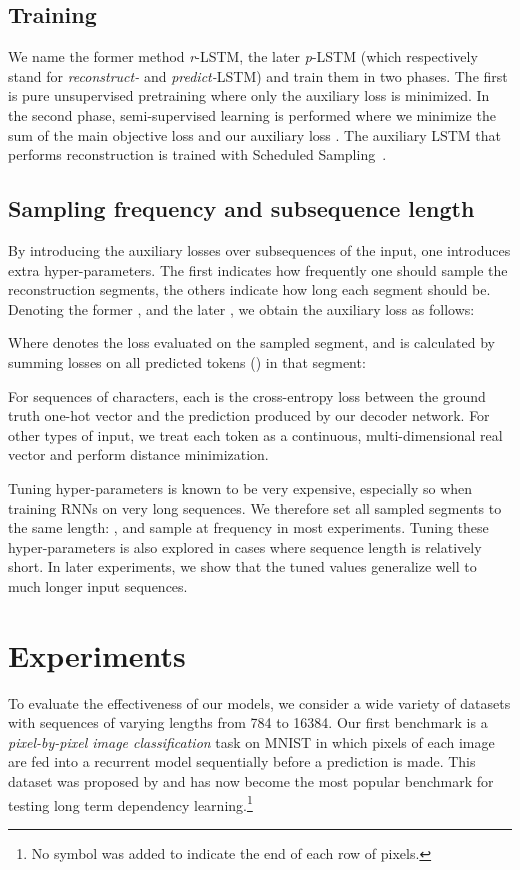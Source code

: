 \documentclass{article}
\newcommand{\rlstm}{{\it r}-LSTM}
\newcommand{\plstm}{{\it p}-LSTM}
\begin{document}
\subsection{Training}

We name the former method \rlstm{}, the later \plstm{} (which respectively stand for {\it reconstruct-} and {\it predict-}LSTM) and train them in two phases. The first is pure unsupervised pretraining where only the auxiliary loss is minimized. In the second phase, semi-supervised learning is performed where we minimize the sum of the main objective loss  and our auxiliary loss . The auxiliary LSTM that performs reconstruction is trained with Scheduled Sampling~\cite{bengio2015scheduled}.

\subsection{Sampling frequency and subsequence length}

By introducing the auxiliary losses over subsequences of the input, one introduces extra hyper-parameters. The first indicates how frequently one should sample the reconstruction segments, the others indicate how long each segment should be. Denoting the former , and the later , we obtain the auxiliary loss as follows:

Where  denotes the loss evaluated on the  sampled segment, and is calculated by summing losses on all predicted tokens () in that segment:
    
For sequences of characters, each  is the cross-entropy loss between the ground truth one-hot vector and the prediction produced by our decoder network. For other types of input, we treat each token as a continuous, multi-dimensional real vector and perform  distance minimization.

Tuning hyper-parameters is known to be very expensive, especially so when training RNNs on very long sequences. We therefore set all sampled segments to the same length: , and sample at frequency  in most experiments. Tuning these hyper-parameters is also explored in cases where sequence length is relatively short. In later experiments, we show that the tuned values generalize well to much longer input sequences.

\section{Experiments} 

To evaluate the effectiveness of our models, we consider a wide variety of datasets with sequences of varying lengths from 784 to 16384. Our first benchmark is a {\it pixel-by-pixel image classification} task on MNIST in which pixels of each image are fed into a recurrent model sequentially before a prediction is made. This dataset was proposed by \citet{le2015simple} and has now become the most popular benchmark for testing long term dependency learning.\footnote{No symbol was added to indicate the end of each row of pixels.}
\end{document}
